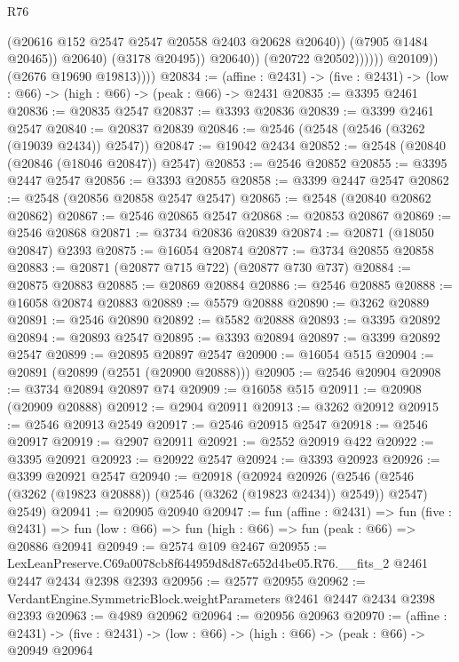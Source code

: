 \begin{lexlean}{R76}
\begin{coremodule}
                                    (@20616 @152 @2547 @2547 @20558 @2403 @20628 @20640))
                                  (@7905 @1484 @20465))
                                @20640)
                              (@3178 @20495))
                            @20640))
                        (@20722 @20502))))))
              @20109))
          (@2676 @19690 @19813))))
@20834 := (affine : @2431) -> (five : @2431) -> (low : @66) -> (high : @66) -> (peak : @66) -> @2431
@20835 := @3395 @2461
@20836 := @20835 @2547
@20837 := @3393 @20836
@20839 := @3399 @2461 @2547
@20840 := @20837 @20839
@20846 := @2546 (@2548 (@2546 (@3262 (@19039 @2434)) @2547))
@20847 := @19042 @2434
@20852 := @2548 (@20840 (@20846 (@18046 @20847)) @2547)
@20853 := @2546 @20852
@20855 := @3395 @2447 @2547
@20856 := @3393 @20855
@20858 := @3399 @2447 @2547
@20862 := @2548 (@20856 @20858 @2547 @2547)
@20865 := @2548 (@20840 @20862 @20862)
@20867 := @2546 @20865 @2547
@20868 := @20853 @20867
@20869 := @2546 @20868
@20871 := @3734 @20836 @20839
@20874 := @20871 (@18050 @20847) @2393
@20875 := @16054 @20874
@20877 := @3734 @20855 @20858
@20883 := @20871 (@20877 @715 @722) (@20877 @730 @737)
@20884 := @20875 @20883
@20885 := @20869 @20884
@20886 := @2546 @20885
@20888 := @16058 @20874 @20883
@20889 := @5579 @20888
@20890 := @3262 @20889
@20891 := @2546 @20890
@20892 := @5582 @20888
@20893 := @3395 @20892
@20894 := @20893 @2547
@20895 := @3393 @20894
@20897 := @3399 @20892 @2547
@20899 := @20895 @20897 @2547
@20900 := @16054 @515
@20904 := @20891 (@20899 (@2551 (@20900 @20888)))
@20905 := @2546 @20904
@20908 := @3734 @20894 @20897 @74
@20909 := @16058 @515
@20911 := @20908 (@20909 @20888)
@20912 := @2904 @20911
@20913 := @3262 @20912
@20915 := @2546 @20913 @2549
@20917 := @2546 @20915 @2547
@20918 := @2546 @20917
@20919 := @2907 @20911
@20921 := @2552 @20919 @422
@20922 := @3395 @20921
@20923 := @20922 @2547
@20924 := @3393 @20923
@20926 := @3399 @20921 @2547
@20940 := @20918
    (@20924
      @20926
      (@2546 (@2546 (@3262 (@19823 @20888)) (@2546 (@3262 (@19823 @2434)) @2549)) @2547)
      @2549)
@20941 := @20905 @20940
@20947 := fun (affine : @2431) =>
  fun (five : @2431) => fun (low : @66) => fun (high : @66) => fun (peak : @66) => @20886 @20941
@20949 := @2574 @109 @2467
@20955 := LexLeanPreserve.C69a0078cb8f644959d8d87c652d4be05.R76.__fits_2
    @2461
    @2447
    @2434
    @2398
    @2393
@20956 := @2577 @20955
@20962 := VerdantEngine.SymmetricBlock.weightParameters @2461 @2447 @2434 @2398 @2393
@20963 := @4989 @20962
@20964 := @20956 @20963
@20970 := (affine : @2431) ->
  (five : @2431) -> (low : @66) -> (high : @66) -> (peak : @66) -> @20949 @20964

\end{coremodule}
\end{lexlean}
